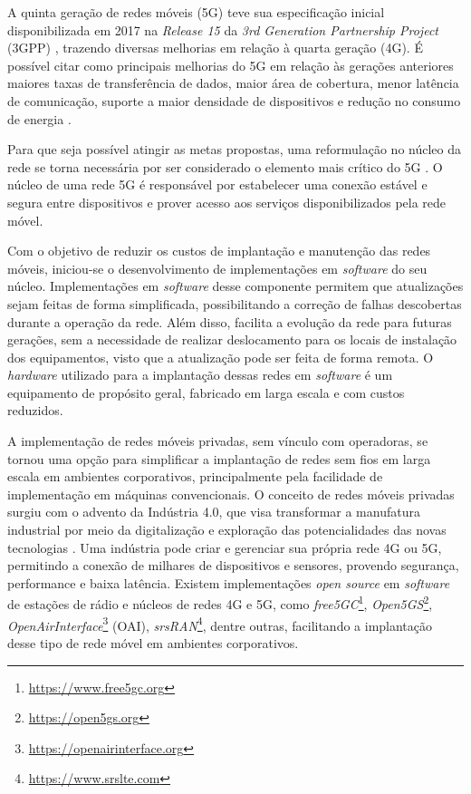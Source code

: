 A quinta geração de redes móveis (5G) teve sua especificação inicial disponibilizada em 2017 na \textit{Release 15} da \textit{3rd Generation Partnership Project} (3GPP) \cite{Redana2020}, trazendo diversas melhorias em relação à quarta geração (4G).
É possível citar como principais melhorias do 5G em relação às gerações anteriores maiores taxas de transferência de dados, maior área de cobertura, menor latência de comunicação, suporte a maior densidade de dispositivos e redução no consumo de energia \cite{Ahmad2019}.

Para que seja possível atingir as metas propostas, uma reformulação no núcleo da rede se torna necessária por ser considerado o elemento mais crítico do 5G \cite{Cardoso2020}.
O núcleo de uma rede 5G é responsável por estabelecer uma conexão estável e segura entre dispositivos e prover acesso aos serviços disponibilizados pela rede móvel.

Com o objetivo de reduzir os custos de implantação e manutenção das redes móveis, iniciou-se o desenvolvimento de implementações em \textit{software} do seu núcleo.
Implementações em \textit{software} desse componente permitem que atualizações sejam feitas de forma simplificada, possibilitando a correção de falhas descobertas durante a operação da rede. Além disso, facilita a evolução da rede para futuras gerações, sem a necessidade de realizar deslocamento para os locais de instalação dos equipamentos, visto que a atualização pode ser feita de forma remota.
O \textit{hardware} utilizado para a implantação dessas redes em \textit{software} é um equipamento de propósito geral, fabricado em larga escala e com custos reduzidos.

A implementação de redes móveis privadas, sem vínculo com operadoras, se tornou uma opção para simplificar a implantação de redes sem fios em larga escala em ambientes corporativos, principalmente pela facilidade de implementação em máquinas convencionais.
O conceito de redes móveis privadas surgiu com o advento da Indústria 4.0, que visa transformar a manufatura industrial por meio da digitalização e exploração das potencialidades das novas tecnologias \cite{Rojko2017}.
Uma indústria pode criar e gerenciar sua própria rede 4G ou 5G, permitindo a conexão de milhares de dispositivos e sensores, provendo segurança, performance e baixa latência.
Existem implementações \textit{open source} em \textit{software} de estações de rádio e núcleos de redes 4G e 5G, como \textit{free5GC}\footnote{\url{https://www.free5gc.org}}, \textit{Open5GS}\footnote{\url{https://open5gs.org}}, \textit{OpenAirInterface}\footnote{\url{https://openairinterface.org}} (OAI), \textit{srsRAN}\footnote{\url{https://www.srslte.com}}, dentre outras, facilitando a implantação desse tipo de rede móvel em ambientes corporativos.


